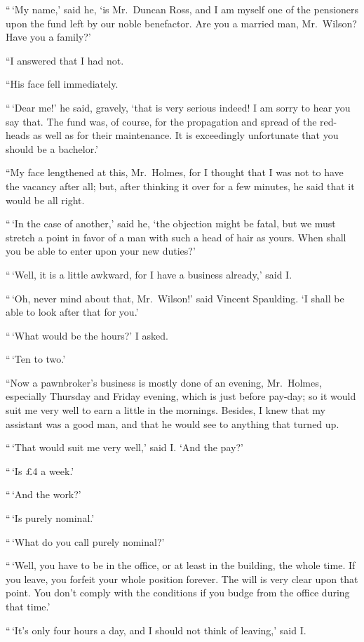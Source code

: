 “\,‘My name,’ said he, ‘is Mr.~Duncan Ross, and I am myself
one of the pensioners upon the fund left by our noble
benefactor. Are you a married man, Mr.~Wilson? Have you
a family?’

“I answered that I had not.

“His face fell immediately.

“\,‘Dear me!’ he said, gravely, ‘that is very serious indeed!
I am sorry to hear you say that. The fund was, of course,
for the propagation and spread of the red-heads as well as for
their maintenance. It is exceedingly unfortunate that you
should be a bachelor.’

“My face lengthened at this, Mr.~Holmes, for I thought
that I was not to have the vacancy after all; but, after
thinking it over for a few minutes, he said that it would be
all right.

“\,‘In the case of another,’ said he, ‘the objection might be
fatal, but we must stretch a point in favor of a man with such
a head of hair as yours. When shall you be able to enter
upon your new duties?’

“\,‘Well, it is a little awkward, for I have a business already,’
said I.

“\,‘Oh, never mind about that, Mr.~Wilson!’ said Vincent
Spaulding. ‘I shall be able to look after that for you.’

“\,‘What would be the hours?’ I asked.

“\,‘Ten to two.’

“Now a pawnbroker’s business is mostly done of an even\-ing,
Mr.~Holmes, especially Thursday and Friday evening,
which is just before pay-day; so it would suit me very well
to earn a little in the mornings. Besides, I knew that my
assistant was a good man, and that he would see to anything
that turned up.

“\,‘That would suit me very well,’ said I. ‘And the pay?’

“\,‘Is £4 a week.’

“\,‘And the work?’

“\,‘Is purely nominal.’

“\,‘What do you call purely nominal?’

“\,‘Well, you have to be in the office, or at least in the
building, the whole time. If you leave, you forfeit your whole
position forever. The will is very clear upon that point.
You don’t comply with the conditions if you budge from the
office during that time.’

“\,‘It’s only four hours a day, and I should not think of
leaving,’ said I.

